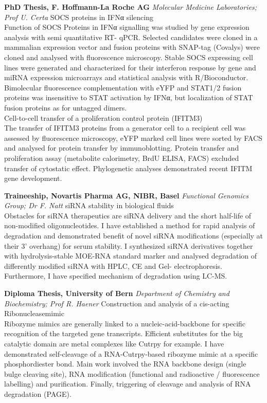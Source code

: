 \documentclass{res}
\begin{document}
\begin{resume}
\textbf{PhD Thesis, F. Hoffmann-La Roche AG}
\textit{Molecular Medicine Laboratories; Prof U. Certa}
SOCS proteins in IFNα silencing \\
Function of SOCS Proteins in IFNα signalling was studied by gene expression analysis with semi quantitative RT- qPCR. Selected candidates were cloned in a mammalian expression vector and fusion proteins with SNAP-tag (Covalys) were cloned and analysed with fluorescence microscopy. Stable SOCS expressing cell lines were generated and characterized for their interferon response by gene and miRNA expression microarrays and statistical analysis with R/Bioconductor. Bimolecular fluorescence complementation with eYFP and STAT1/2 fusion proteins was insensitive to STAT activation by IFNα, but localization of STAT fusion proteins as for untagged dimers. \\
Cell-to-cell transfer of a proliferation control protein (IFITM3) \\
The transfer of IFITM3 proteins from a generator cell to a recipient cell was assessed by fluorescence microscopy, eYFP marked cell lines were sorted by FACS and analysed for protein transfer by immunoblotting. Protein transfer and proliferation assay (metabolite calorimetry, BrdU ELISA, FACS) excluded transfer of cytostatic effect.
Phylogenetic analyses demonstrated recent IFITM gene development.
\,

\textbf{Traineeship, Novartis Pharma AG, NIBR, Basel}
\textit{Functional Genomics Group; Dr F. Natt}
siRNA stability in biological fluids \\
Obstacles for siRNA therapeutics are siRNA delivery and the short half-life of non-modified oligonucleotides. I have established a method for rapid analysis of degradation and demonstrated benefit of novel siRNA modifications (especially at their 3’ overhang) for serum stability. I synthesized siRNA derivatives together with hydrolysis-stable MOE-RNA standard marker and analysed degradation of differently modified siRNA with HPLC, CE and Gel- electrophoresis. Furthermore, I have specified mechanism of degradation using LC-MS.
\,

\textbf{Diploma Thesis, University of Bern}
\textit{Department of Chemistry and Biochemistry; Prof R. Haener}
Construction and analysis of a cis-acting Ribonucleasemimic \\
Ribozyme mimics are generally linked to a nucleic-acid-backbone for specific recognition of the targeted gene transcripts. Efficient substitutes for the big catalytic domain are metal complexes like Cutrpy for example. I have demonstrated self-cleavage of a RNA-Cutrpy-based ribozyme mimic at a specific phosphordiester bond. Main work involved the RNA backbone design (single bulge cleaving site), RNA modification (functional and radioactive / fluorescence labelling) and purification. Finally, triggering of cleavage and analysis of RNA degradation (PAGE).


\end{resume}
\end{document}
